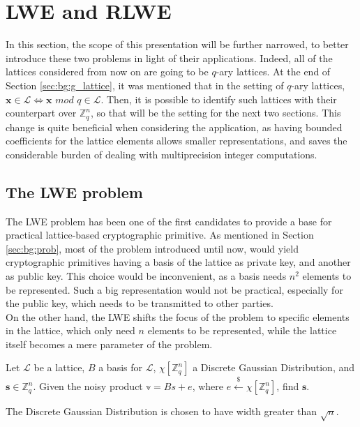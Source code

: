 \section{LWE and RLWE}
In this section, the scope of this presentation will be further narrowed, to better introduce these two problems in light of their applications. Indeed, all of the lattices considered from now on are going to be $q$-ary lattices. At the end of Section \ref{sec:bg:g_lattice}, it was mentioned that in the setting of $q$-ary lattices, $\mathbf{x}\in\mathscr{L}\Leftrightarrow\mathbf{x}$ $mod$ $q\in\mathscr{L}$. Then, it is possible to identify such lattices with their counterpart over $\mathbb{Z}_q^n$, so that will be the setting for the next two sections. This change is quite beneficial when considering the application, as having bounded coefficients for the lattice elements allows smaller representations, and saves the considerable burden of dealing with  multiprecision integer computations. \\

\subsection{The LWE problem}
The LWE problem has been one of the first candidates to provide a base for practical lattice-based cryptographic primitive. As mentioned in Section \ref{sec:bg:prob}, most of the problem introduced until now, would yield cryptographic primitives having a basis of the lattice as private key, and another as public key. This choice would be inconvenient, as a basis needs $n^2$ elements to be represented. Such a big representation would not be practical, especially for the public key, which needs to be transmitted to other parties.\\
On the other hand, the LWE shifts the focus of the problem to specific elements in the lattice, which only need $n$ elements to be represented, while the lattice itself becomes a mere parameter of the problem.\\


\begin{definition}
Let $\mathscr{L}$ be a lattice, $B$ a basis for $\mathscr{L}$, $\chi[\mathbb{Z}_q^n]$ a Discrete Gaussian Distribution, and $\mathbf{s}\in\mathbb{Z}_q^n$. Given the noisy product $\mathbb{v}=Bs + e$, where $e\xleftarrow{\$}\chi[\mathbb{Z}_q^n]$, find $\mathbf{s}$.
\end{definition}

\begin{remark}
The Discrete Gaussian Distribution is chosen to have width greater than $\sqrt{n}$.
\end{remark}

